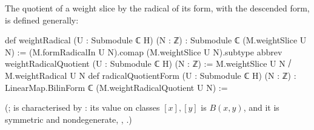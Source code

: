 The quotient of a weight slice by the radical of its form, with the descended form, is defined
generally:
\begin{leancode}
def weightRadical (U : Submodule ℂ H) (N : ℤ) :
    Submodule ℂ (M.weightSlice U N) :=
  (M.formRadicalIn U N).comap (M.weightSlice U N).subtype
abbrev weightRadicalQuotient (U : Submodule ℂ H) (N : ℤ) :=
  M.weightSlice U N ⧸ M.weightRadical U N
def radicalQuotientForm (U : Submodule ℂ H) (N : ℤ) :
    LinearMap.BilinForm ℂ (M.weightRadicalQuotient U N) :=
\end{leancode}
(;  is characterised by
: its value on classes $[x],[y]$ is $B(x,y)$, and it is symmetric and
nondegenerate, , .)

